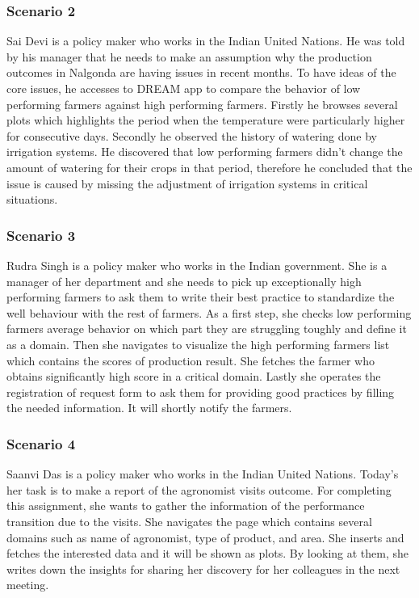 \subsubsection*{Scenario 2}
Sai Devi is a policy maker who works in the Indian United Nations. He was told by his manager that he needs to make an assumption why the production outcomes in Nalgonda are having issues in recent months. To have ideas of the core issues, he accesses to DREAM app to compare the behavior of low performing farmers against high performing farmers. Firstly he browses several plots which highlights the period when the temperature were particularly higher for consecutive days. Secondly he observed the history of watering done by irrigation systems. He discovered that low performing farmers didn't change the amount of watering for their crops in that period, therefore he concluded that the issue is caused by missing the adjustment of irrigation systems in critical situations.   
\subsubsection*{Scenario 3}
Rudra Singh is a policy maker who works in the Indian government. She is a manager of her department and she needs to pick up exceptionally high performing farmers to ask them to write their best practice to standardize the well behaviour with the rest of farmers. As a first step, she checks low performing farmers average behavior on which part they are struggling toughly and define it as a domain. Then she navigates to visualize the high performing farmers list which contains the scores of production result. She fetches the farmer who obtains significantly high score in a critical domain. Lastly she operates the registration of request form to ask them for providing good practices by filling the needed information. It will shortly notify the farmers. 
\subsubsection*{Scenario 4}
Saanvi Das is a policy maker who works in the Indian United Nations. Today's her task is to make a report of the agronomist visits outcome. For completing this assignment, she wants to gather the information of the performance transition due to the visits. She navigates the page which contains several domains such as name of agronomist, type of product, and area. She inserts and fetches the interested data and it will be shown as plots. By looking at them, she writes down the insights for sharing her discovery for her colleagues in the next meeting.  

